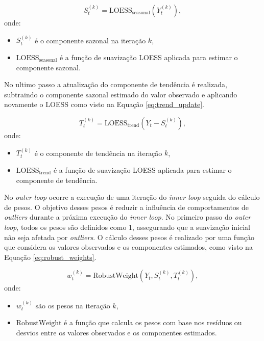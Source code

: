 \begin{equation}
    S^{(k)}_t = \text{LOESS}_{\text{seasonal}}(Y^{(k)}_t),
    \label{eq:seasonal_smoothing}
\end{equation}
onde:
\begin{itemize}
    \item \( S^{(k)}_t \) é o componente sazonal na iteração \( k \),
    \item \( \text{LOESS}_{\text{seasonal}} \) é a função de suavização LOESS aplicada para estimar o componente sazonal.
\end{itemize}

No ultimo passo a atualização do componente de tendência é realizada, subtraindo o componente sazonal estimado do valor observado e aplicando novamente o LOESS como visto na Equação \eqref{eq:trend_update}.

\begin{equation}
    T^{(k)}_t = \text{LOESS}_{\text{trend}}(Y_t - S^{(k)}_t),
    \label{eq:trend_update}
\end{equation}
onde:
\begin{itemize}
    \item \( T^{(k)}_t \) é o componente de tendência na iteração \( k \),
    \item \( \text{LOESS}_{\text{trend}} \) é a função de suavização LOESS aplicada para estimar o componente de tendência.
\end{itemize}

No \textit{outer loop} ocorre a execução de uma iteração do \textit{inner loop} seguida do cálculo de pesos. O objetivo desses pesos é reduzir a influência de comportamentos de \textit{outliers} durante a próxima execução do \textit{inner loop}. No primeiro passo do \textit{outer loop}, todos os pesos são definidos como 1, assegurando que a suavização inicial não seja afetada por \textit{outliers}. O cálculo desses pesos é realizado por uma função que considera os valores observados e os componentes estimados, como visto na Equação \eqref{eq:robust_weights}.

\begin{equation}
    w_t^{(k)} = \text{RobustWeight}(Y_t, S^{(k)}_t, T^{(k)}_t),
    \label{eq:robust_weights}
\end{equation}
onde:
\begin{itemize}
    \item \( w_t^{(k)} \) são os pesos na iteração \( k \),
    \item \( \text{RobustWeight} \) é a função que calcula os pesos com base nos resíduos ou desvios entre os valores observados e os componentes estimados.
\end{itemize}

